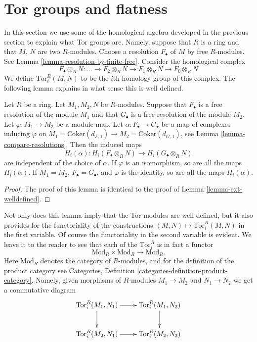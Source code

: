 \section{Tor groups and flatness}
\label{section-tor}

\noindent
In this section we use some of the homological algebra
developed in the previous section to explain what
Tor groups are. Namely, suppose that $R$ is a ring
and that $M$, $N$ are two $R$-modules. Choose
a resolution $F_\bullet$ of $M$ by free $R$-modules.
See Lemma \ref{lemma-resolution-by-finite-free}.
Consider the homological complex
$$
F_\bullet \otimes_R N
:
\ldots
\to F_2 \otimes_R N
\to F_1 \otimes_R N
\to F_0 \otimes_R N
$$
We define $\text{Tor}^R_i(M, N)$ to be the $i$th homology
group of this complex. The following lemma explains in
what sense this is well defined.

\begin{lemma}
\label{lemma-tor-welldefined}
Let $R$ be a ring. Let $M_1, M_2, N$ be $R$-modules.
Suppose that $F_\bullet$ is a free resolution of
the module $M_1$ and that $G_\bullet$ is a free
resolution of the module $M_2$. Let $\varphi : M_1 \to M_2$
be a module map. Let $\alpha : F_\bullet \to G_\bullet$
be a map of complexes inducing $\varphi$ on
$M_1 = \text{Coker}(d_{F, 1}) \to M_2 = \text{Coker}(d_{G, 1})$,
see Lemma \ref{lemma-compare-resolutions}.
Then the induced maps
$$
H_i(\alpha) :
H_i(F_\bullet \otimes_R N)
\longrightarrow
H_i(G_\bullet \otimes_R N)
$$
are independent of the choice of $\alpha$. If $\varphi$
is an isomorphism, so are all the maps $H_i(\alpha)$.
If $M_1 = M_2$, $F_\bullet = G_\bullet$, and
$\varphi$ is the identity, so are all the maps $H_i(\alpha)$.
\end{lemma}

\begin{proof}
The proof of this lemma is identical to the proof of Lemma
\ref{lemma-ext-welldefined}.
\end{proof}

\noindent
Not only does this lemma imply that the Tor modules are well defined,
but it also provides for the functoriality of the constructions
$(M, N) \mapsto \text{Tor}_i^R(M, N)$ in the first variable. Of course
the functoriality in the second variable is evident. We leave it to
the reader to see that each of the $\text{Tor}_i^R$ is in fact
a functor
$$
\text{Mod}_R \times \text{Mod}_R \to \text{Mod}_R.
$$
Here $\text{Mod}_R$ denotes the category of $R$-modules, and
for the definition of the product category
see Categories, Definition \ref{categories-definition-product-category}.
Namely, given morphisms of $R$-modules $M_1 \to M_2$
and $N_1 \to N_2$ we get a commutative diagram
$$
\xymatrix{
\text{Tor}_i^R(M_1, N_1) \ar[r] \ar[d] &
\text{Tor}_i^R(M_1, N_2) \ar[d] \cr
\text{Tor}_i^R(M_2, N_1) \ar[r] &
\text{Tor}_i^R(M_2, N_2) \cr
}
$$

